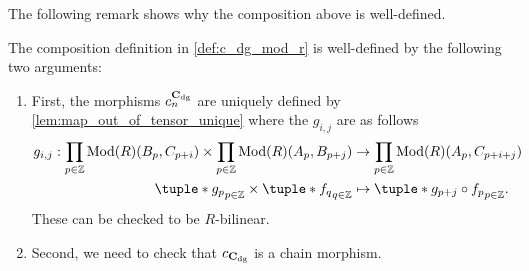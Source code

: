 The following remark shows why the composition above is well-defined.

\begin{remark}
    The composition definition in \autoref{def:c_dg_mod_r} is well-defined by the following two arguments:

    \begin{enumerate}
        \item {
            First, the morphisms \( c_n^{\operatorname{\mathbf{C}}_{\operatorname{dg}}} \) are uniquely defined by \autoref{lem:map_out_of_tensor_unique} where the \( g_{i, j} \) are as follows
            \begin{align*}
                g_{i, j}: \prod_{p \in \Zb} \Mod(R)(B_p, C_{p + i}) \times \prod_{p \in \Zb} \Mod(R)(A_p, B_{p + j}) &\to \prod_{p \in \Zb} \Mod(R)(A_p, C_{p + i + j}) \\
                \tuple*{ g_p }_{p \in \Zb} \times \tuple*{ f_q }_{q \in \Zb} &\mapsto \tuple*{ g_{p + j} \circ f_p }_{p \in \Zb}.
            \end{align*}
            These can be checked to be \( R \)-bilinear.
        }
        \item {
            Second, we need to check that \( c_{\operatorname{\mathbf{C}}_{\operatorname{dg}}} \) is a chain morphism.

}
\end{enumerate}
\end{remark}
